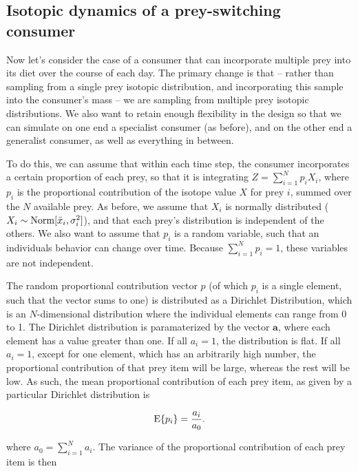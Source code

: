\documentclass[11pt]{article}
\begin{document}
\subsection{Isotopic dynamics of a prey-switching consumer}

Now let's consider the case of a consumer that can incorporate multiple prey into its diet over the course of each day.
The primary change is that -- rather than sampling from a single prey isotopic distribution, and incorporating this sample into the consumer's mass -- we are sampling from multiple prey isotopic distributions.
We also want to retain enough flexibility in the design so that we can simulate on one end a specialist consumer (as before), and on the other end a generalist consumer, as well as everything in between.

To do this, we can assume that within each time step, the consumer incorporates a certain proportion of each prey, so that it is integrating $Z = \sum_{i=1}^Np_iX_i$, where $p_i$ is the proportional contribution of the isotope value $X$ for prey $i$, summed over the $N$ available prey.
As before, we assume that $X_i$ is normally distributed ($X_i \sim {\rm Norm}[\bar{x}_i, \sigma_i^2]$), and that each prey's distribution is independent of the others.
We also want to assume that $p_i$ is a random variable, such that an individuals behavior can change over time.
Because $\sum_{i=1}^N p_i = 1$, these variables are not independent.

The random proportional contribution vector $p$ (of which $p_i$ is a single element, such that the vector sums to one) is distributed as a Dirichlet Distribution, which is an $N$-dimensional distribution where the individual elements can range from 0 to 1.
The Dirichlet distribution is paramaterized by the vector $\bm a$, where each element has a value greater than one.
If all $a_i = 1$, the distribution is flat.
If all $a_i = 1$, except for one element, which has an arbitrarily high number, the proportional contribution of that prey item will be large, whereas the rest will be low.
As such, the mean proportional contribution of each prey item, as given by a particular Dirichlet distribution is

\begin{equation}
	{\rm E}\{p_i\} = \frac{a_i}{a_0}.
\end{equation}

\noindent where $a_0 = \sum_{i=1}^N a_i$.
The variance of the proportional contribution of each prey item is then
\end{document}
